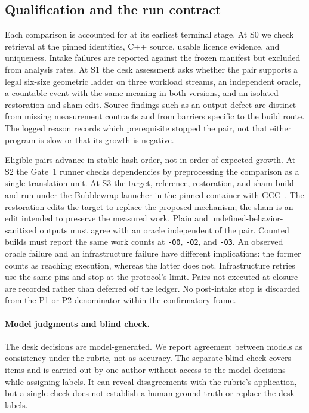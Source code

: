 \documentclass[11pt]{article}
\begin{document}
\subsection{Qualification and the run contract}

Each comparison is accounted for at its earliest terminal stage. At
\textsc{S0} we check retrieval at the pinned identities, C++ source, usable
licence evidence, and uniqueness. Intake failures are reported against the
frozen manifest but excluded from analysis rates. At \textsc{S1} the desk
assessment asks whether the pair supports a legal six-size geometric
ladder on three workload streams, an independent oracle, a countable
event with the same meaning in both versions, and an isolated restoration
and sham edit. Source findings
such as an output defect are distinct from missing measurement contracts
and from barriers specific to the build route. The logged reason records
which prerequisite stopped the pair, not that either program is slow or
that its growth is negative.

Eligible pairs advance in stable-hash order, not in order of expected
growth. At \textsc{S2} the Gate~1 runner checks dependencies by preprocessing
the comparison as a single translation unit. At \textsc{S3} the target,
reference, restoration, and sham build and run under the Bubblewrap
launcher in the pinned container with GCC~\BenchGCC. The restoration edits
the target to replace the proposed mechanism; the sham is an edit intended
to preserve the measured work. Plain and undefined-behavior-sanitized
outputs must agree with an oracle independent of the pair. Counted builds
must report the same work counts at \texttt{-O0}, \texttt{-O2}, and
\texttt{-O3}. An observed oracle failure and an infrastructure failure have
different implications: the former counts as reaching execution, whereas
the latter does not. Infrastructure retries use the same pins and stop at
the protocol's limit. Pairs not executed at closure are recorded rather
than deferred off the ledger. No post-intake stop is discarded from the
P1 or P2 denominator within the confirmatory frame.

\paragraph{Model judgments and blind check.}
The desk decisions are model-generated. \BenchDeskMethods{} We report
agreement between models as consistency under the rubric, not as accuracy.
The separate blind check covers \BenchAuthorSample{} items and is carried
out by one author without access to the model decisions while assigning
labels. It can reveal disagreements with the rubric's application, but a
single check does not establish a human ground truth or replace the desk
labels.
\end{document}
